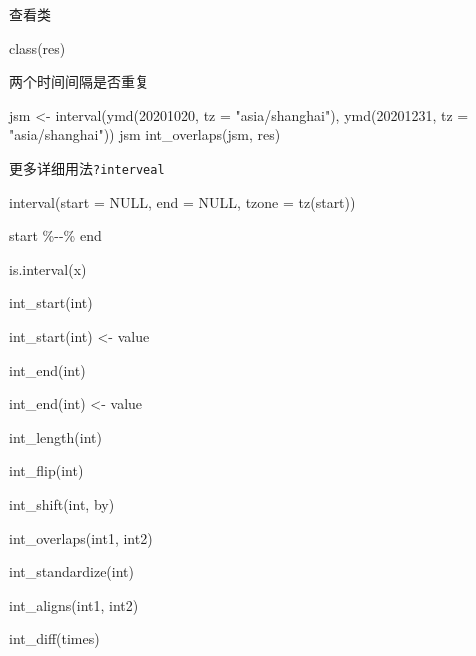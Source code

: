 \documentclass[
]{book}
\newenvironment{Shaded}{\begin{snugshade}}{\end{snugshade}}
\newcommand{\AttributeTok}[1]{\textcolor[rgb]{0.77,0.63,0.00}{#1}}
\newcommand{\ConstantTok}[1]{\textcolor[rgb]{0.00,0.00,0.00}{#1}}
\newcommand{\DecValTok}[1]{\textcolor[rgb]{0.00,0.00,0.81}{#1}}
\newcommand{\FunctionTok}[1]{\textcolor[rgb]{0.00,0.00,0.00}{#1}}
\newcommand{\NormalTok}[1]{#1}
\newcommand{\OtherTok}[1]{\textcolor[rgb]{0.56,0.35,0.01}{#1}}
\newcommand{\SpecialCharTok}[1]{\textcolor[rgb]{0.00,0.00,0.00}{#1}}
\newcommand{\StringTok}[1]{\textcolor[rgb]{0.31,0.60,0.02}{#1}}
\begin{document}
查看类

\begin{Shaded}
\begin{Highlighting}[]
\FunctionTok{class}\NormalTok{(res)}
\end{Highlighting}
\end{Shaded}

两个时间间隔是否重复

\begin{Shaded}
\begin{Highlighting}[]
\NormalTok{jsm }\OtherTok{\textless{}{-}} \FunctionTok{interval}\NormalTok{(}\FunctionTok{ymd}\NormalTok{(}\DecValTok{20201020}\NormalTok{, }\AttributeTok{tz =} \StringTok{"asia/shanghai"}\NormalTok{), }\FunctionTok{ymd}\NormalTok{(}\DecValTok{20201231}\NormalTok{, }\AttributeTok{tz =} \StringTok{"asia/shanghai"}\NormalTok{))}
\NormalTok{jsm}
\FunctionTok{int\_overlaps}\NormalTok{(jsm, res)}
\end{Highlighting}
\end{Shaded}

更多详细用法\texttt{?interveal}

\begin{Shaded}
\begin{Highlighting}[]
\FunctionTok{interval}\NormalTok{(}\AttributeTok{start =} \ConstantTok{NULL}\NormalTok{, }\AttributeTok{end =} \ConstantTok{NULL}\NormalTok{, }\AttributeTok{tzone =} \FunctionTok{tz}\NormalTok{(start))}

\NormalTok{start }\SpecialCharTok{\%{-}{-}\%}\NormalTok{ end}

\FunctionTok{is.interval}\NormalTok{(x)}

\FunctionTok{int\_start}\NormalTok{(int)}

\FunctionTok{int\_start}\NormalTok{(int) }\OtherTok{\textless{}{-}}\NormalTok{ value}

\FunctionTok{int\_end}\NormalTok{(int)}

\FunctionTok{int\_end}\NormalTok{(int) }\OtherTok{\textless{}{-}}\NormalTok{ value}

\FunctionTok{int\_length}\NormalTok{(int)}

\FunctionTok{int\_flip}\NormalTok{(int)}

\FunctionTok{int\_shift}\NormalTok{(int, by)}

\FunctionTok{int\_overlaps}\NormalTok{(int1, int2)}

\FunctionTok{int\_standardize}\NormalTok{(int)}

\FunctionTok{int\_aligns}\NormalTok{(int1, int2)}

\FunctionTok{int\_diff}\NormalTok{(times)}
\end{Highlighting}
\end{Shaded}
\end{document}
